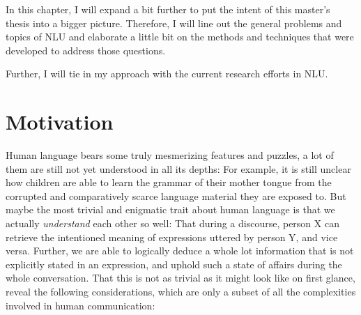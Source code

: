 \label{chap:1_intro}


In this chapter, I will expand a bit further to put the intent of this master's thesis into
a bigger picture. Therefore, I will line out the general problems and topics of NLU and elaborate
a little bit on the methods and techniques that were developed to address those questions.

Further, I will tie in my {\color{red} approach} with the current research efforts in NLU.

\section{Motivation}

Human language bears some truly mesmerizing features and puzzles, a lot of them are still not
yet understood in all its depths: For example, it is still unclear how children are able to
learn the grammar of their mother tongue from the corrupted and comparatively scarce language
material they are exposed to.
But maybe the most trivial and enigmatic trait about human language is that we actually
\emph{understand} each other so well: That during a discourse, person X can retrieve
the intentioned meaning of expressions uttered by person Y, and vice versa. Further, we
are able to logically deduce a whole lot information that is not explicitly stated in an
expression, and uphold such a state of affairs during the whole conversation.
That this is not as trivial as it might look like on first glance, reveal the following
considerations, which are only a subset of all the complexities involved in human communication:

